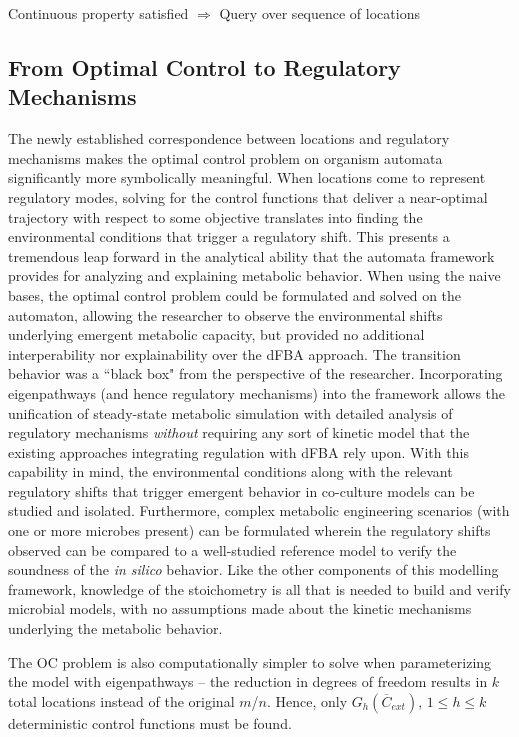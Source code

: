 Continuous property satisfied $\Rightarrow$ Query over sequence of locations


\subsection{From Optimal Control to Regulatory Mechanisms}

The newly established correspondence between locations and regulatory mechanisms makes the optimal control problem on organism automata significantly more symbolically meaningful. When locations come to represent regulatory modes, solving for the control functions that deliver a near-optimal trajectory with respect to some objective translates into finding the environmental conditions that trigger a regulatory shift. This presents a tremendous leap forward in the analytical ability that the automata framework provides for analyzing and explaining metabolic behavior. When using the naive bases, the optimal control problem could be formulated and solved on the automaton, allowing the researcher to observe the environmental shifts underlying emergent metabolic capacity, but provided no additional interperability nor explainability over the dFBA approach. The transition behavior was a ``black box" from the perspective of the researcher. Incorporating eigenpathways (and hence regulatory mechanisms) into the framework allows the unification of steady-state metabolic simulation with detailed analysis of regulatory mechanisms \textit{without} requiring any sort of kinetic model that the existing approaches integrating regulation with dFBA rely upon. With this capability in mind, the environmental conditions along with the relevant regulatory shifts that trigger emergent behavior in co-culture models can be studied and isolated. Furthermore, complex metabolic engineering scenarios (with one or more microbes present) can be formulated wherein the regulatory shifts observed can be compared to a well-studied reference model to verify the soundness of the \textit{in silico} behavior. Like the other components of this modelling framework, knowledge of the stoichometry is all that is needed to build and verify microbial models, with no assumptions made about the kinetic mechanisms underlying the metabolic behavior.

The OC problem is also computationally simpler to solve when parameterizing the model with eigenpathways -- the reduction in degrees of freedom results in $k$ total locations instead of the original $m$/$n$. Hence, only $G_{h}(\overline{C}_{ext})$, $1 \leq h \leq k$ deterministic control functions must be found.

